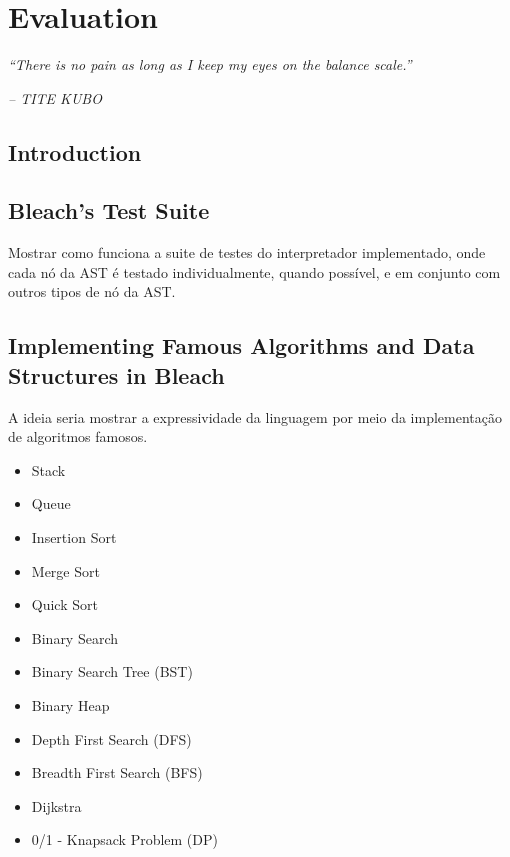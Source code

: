 \chapter{Evaluation} \label{cap:Resultados}

\begin{displayquote}
    \begin{center}
        \textit{``There is no pain as long as I keep my eyes on the balance scale.''}
    \end{center}
\end{displayquote}

\begin{flushright}
   \textit{-- TITE KUBO}
\end{flushright}

\section{Introduction}

\section{Bleach's Test Suite}
Mostrar como funciona a suite de testes do interpretador implementado, onde cada nó da AST é testado individualmente, quando possível, e em conjunto com outros tipos de nó da AST.

\section{Implementing Famous Algorithms and Data Structures in Bleach}
A ideia seria mostrar a expressividade da linguagem por meio da implementação de algoritmos famosos.
\begin{itemize}
    \item Stack
    \item Queue
    \item Insertion Sort
    \item Merge Sort
    \item Quick Sort
    \item Binary Search
    \item Binary Search Tree (BST)
    \item Binary Heap
    \item Depth First Search (DFS)
    \item Breadth First Search (BFS)
    \item Dijkstra
    \item 0/1 - Knapsack Problem (DP)
\end{itemize}

